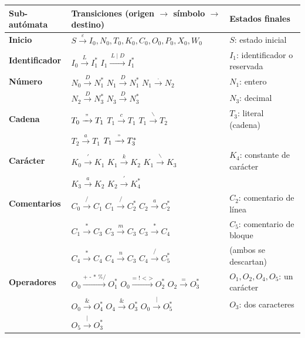 \documentclass[12pt,letterpaper]{article}
\begin{document}
{\small
\noindent
{}
\begin{tabularx}{\textwidth}{@{} >{\bfseries}p{2.8cm} X p{5.5cm} @{}}
\rowcolor{tableheader}
\textbf{Sub-autómata} & \textbf{Transiciones (origen $\rightarrow$ símbolo $\rightarrow$ destino)} & \textbf{Estados finales} \\ 
\toprule

Inicio & $S \xrightarrow{\,\varepsilon\,} I_0, N_0, T_0, K_0, C_0, O_0, P_0, X_0, W_0$ & $S$: estado inicial \\

Identificador & $I_0 \xrightarrow{\,L\,} I_1^*$ \quad $I_1 \xrightarrow{\,L \mid D\,} I_1^*$ & $I_1$: identificador o reservada \\

Número & $N_0 \xrightarrow{\,D\,} N_1^*$ \quad $N_1 \xrightarrow{\,D\,} N_1^*$ \quad $N_1 \xrightarrow{\,.\,} N_2$ & $N_1$: entero \\
& $N_2 \xrightarrow{\,D\,} N_3^*$ \quad $N_3 \xrightarrow{\,D\,} N_3^*$ & $N_3$: decimal \\

Cadena & $T_0 \xrightarrow{\,"\,} T_1$ \quad $T_1 \xrightarrow{\,c\,} T_1$ \quad $T_1 \xrightarrow{\,\backslash\,} T_2$ & $T_3$: literal (cadena) \\
& $T_2 \xrightarrow{\,a\,} T_1$ \quad $T_1 \xrightarrow{\,"\,} T_3^*$ & \\

Carácter & $K_0 \xrightarrow{\,'\,} K_1$ \quad $K_1 \xrightarrow{\,k\,} K_2$ \quad $K_1 \xrightarrow{\,\backslash\,} K_3$ & $K_4$: constante de carácter \\
& $K_3 \xrightarrow{\,a\,} K_2$ \quad $K_2 \xrightarrow{\,'\,} K_4^*$ & \\

Comentarios & $C_0 \xrightarrow{\,/\,} C_1$ \quad $C_1 \xrightarrow{\,/\,} C_2^*$ \quad $C_2 \xrightarrow{\,a\,} C_2^*$ & $C_2$: comentario de línea \\
& $C_1 \xrightarrow{\,*\,} C_3$ \quad $C_3 \xrightarrow{\,m\,} C_3$ \quad $C_3 \xrightarrow{\,*\,} C_4$ & $C_5$: comentario de bloque \\
& $C_4 \xrightarrow{\,*\,} C_4$ \quad $C_4 \xrightarrow{\,n\,} C_3$ \quad $C_4 \xrightarrow{\,/\,} C_5^*$ & (ambos se descartan) \\

Operadores & $O_0 \xrightarrow{\text{+ - * \% /}} O_1^*$ \quad $O_0 \xrightarrow{\text{= ! < >}} O_2^*$ \quad $O_2 \xrightarrow{\text{=}} O_3^*$ & $O_1, O_2, O_4, O_5$: un carácter \\
& $O_0 \xrightarrow{\text{\&}} O_4^*$ \quad $O_4 \xrightarrow{\text{\&}} O_3^*$ \quad $O_0 \xrightarrow{\text{|}} O_5^*$ & $O_3$: dos caracteres \\
& $O_5 \xrightarrow{\text{|}} O_3^*$ & \\


\end{tabularx}}
\end{document}
